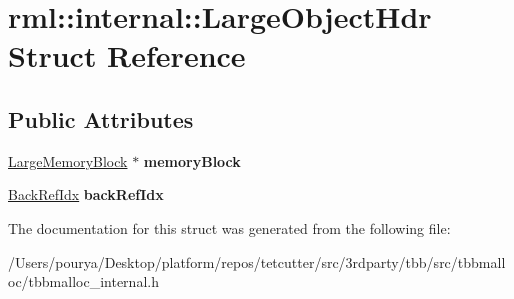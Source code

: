\hypertarget{structrml_1_1internal_1_1LargeObjectHdr}{}\section{rml\+:\+:internal\+:\+:Large\+Object\+Hdr Struct Reference}
\label{structrml_1_1internal_1_1LargeObjectHdr}
\subsection*{Public Attributes}
\begin{DoxyCompactItemize}
\item 
\hypertarget{structrml_1_1internal_1_1LargeObjectHdr_a2d77c3b9d9a27632c3e7b76818765cc1}{}\hyperlink{structrml_1_1internal_1_1LargeMemoryBlock}{Large\+Memory\+Block} $\ast$ {\bfseries memory\+Block}\label{structrml_1_1internal_1_1LargeObjectHdr_a2d77c3b9d9a27632c3e7b76818765cc1}

\item 
\hypertarget{structrml_1_1internal_1_1LargeObjectHdr_af702dce8b9ebd3e2d73fde65789d5dcd}{}\hyperlink{classrml_1_1internal_1_1BackRefIdx}{Back\+Ref\+Idx} {\bfseries back\+Ref\+Idx}\label{structrml_1_1internal_1_1LargeObjectHdr_af702dce8b9ebd3e2d73fde65789d5dcd}

\end{DoxyCompactItemize}


The documentation for this struct was generated from the following file\+:\begin{DoxyCompactItemize}
\item 
/\+Users/pourya/\+Desktop/platform/repos/tetcutter/src/3rdparty/tbb/src/tbbmalloc/tbbmalloc\+\_\+internal.\+h\end{DoxyCompactItemize}
